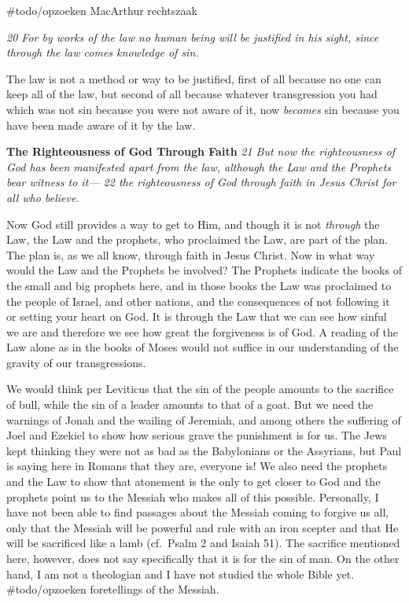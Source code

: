 \#todo/opzoeken MacArthur rechtszaak

\emph{20 For by works of the law no human being will be justified in his
sight, since through the law comes knowledge of sin.}

The law is not a method or way to be justified, first of all because no
one can keep all of the law, but second of all because whatever
transgression you had which was not sin because you were not aware of
it, now \emph{becomes} sin because you have been made aware of it by the
law.

\textbf{The Righteousness of God Through Faith} \emph{21 But now the
righteousness of God has been manifested apart from the law, although
the Law and the Prophets bear witness to it--- 22 the righteousness of
God through faith in Jesus Christ for all who believe.}

Now God still provides a way to get to Him, and though it is not
\emph{through} the Law, the Law and the prophets, who proclaimed the
Law, are part of the plan. The plan is, as we all know, through faith in
Jesus Christ. Now in what way would the Law and the Prophets be
involved? The Prophets indicate the books of the small and big prophets
here, and in those books the Law was proclaimed to the people of Israel,
and other nations, and the consequences of not following it or setting
your heart on God. It is through the Law that we can see how sinful we
are and therefore we see how great the forgiveness is of God. A reading
of the Law alone as in the books of Moses would not suffice in our
understanding of the gravity of our transgressions.

We would think per Leviticus that the sin of the people amounts to the
sacrifice of bull, while the sin of a leader amounts to that of a goat.
But we need the warnings of Jonah and the wailing of Jeremiah, and among
others the suffering of Joel and Ezekiel to show how serious grave the
punishment is for us. The Jews kept thinking they were not as bad as the
Babylonians or the Assyrians, but Paul is saying here in Romans that
they are, everyone is! We also need the prophets and the Law to show
that atonement is the only to get closer to God and the prophets point
us to the Messiah who makes all of this possible. Personally, I have not
been able to find passages about the Messiah coming to forgive us all,
only that the Messiah will be powerful and rule with an iron scepter and
that He will be sacrificed like a lamb (cf.~Psalm 2 and Isaiah 51). The
sacrifice mentioned here, however, does not say specifically that it is
for the sin of man. On the other hand, I am not a theologian and I have
not studied the whole Bible yet. \#todo/opzoeken foretellings of the
Messiah.


